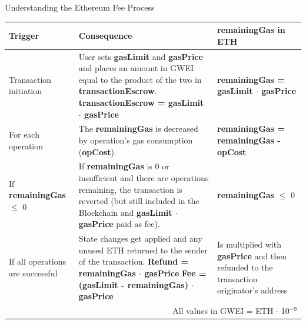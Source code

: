 \documentclass[]{beamer}
\begin{document}
\begin{frame}{Understanding the Ethereum Fee Process}
\begin{table}
	\tiny
	{\renewcommand{\arraystretch}{2}%
  \center
  \begin{tabular}[]{m{} | m{}| m{}}
  		\hline \hline
		\textbf{Trigger} & \textbf{Consequence} & \textbf{remainingGas in ETH}\\
		\hline
			Transaction initiation
			& User sets \textbf{gasLimit} and \textbf{gasPrice} and places an amount in GWEI equal to the product of the two in \textbf{transactionEscrow}. \newline \newline \textbf{transactionEscrow = gasLimit $\cdot$ gasPrice}
			& \textbf{remainingGas = gasLimit $\cdot$ gasPrice}\\
		\hline
			For each operation
			& The \textbf{remainingGas} is decreased by operation’s gas consumption (\textbf{opCost}).
			& \textbf{remainingGas = remainingGas - opCost}\\
		\hline
			If \textbf{remainingGas} $\leq$ 0
			& If \textbf{remainingGas} is 0 or insufficient and there are operations remaining, the transaction is reverted (but still included in the Blockchain and \textbf{gasLimit $\cdot$ gasPrice} paid as fee).
			& \textbf{remainingGas} $\leq$ 0\\
		\hline
			If all operations are successful
			& State changes get applied and any unused ETH returned to the sender of the transaction. \newline \newline
			\textbf{Refund = remainingGas $\cdot$ gasPrice} \newline \newline %
			\textbf{Fee = (gasLimit - remainingGas) $\cdot$ gasPrice} %
			& Is multiplied with \textbf{gasPrice} and then refunded to the transaction originator’s address\\%
		\hline
		\multicolumn{3}{r}{All values in GWEI = ETH $\cdot$ 10$^{-9}$}\\
  \end{tabular}}
\end{table}
\end{frame}
\end{document}
